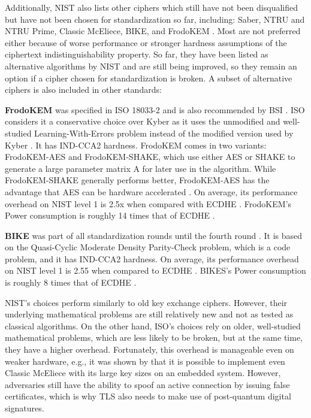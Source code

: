 \documentclass[public,noindent]{aisecreport}
\begin{document}
Additionally, NIST also lists other ciphers which still have not been disqualified but have not been chosen for standardization so far, including: Saber, NTRU and NTRU Prime, Classic McEliece, BIKE, and FrodoKEM \cite{alagic2022status, alagic2025status}. Most are not preferred either because of worse performance or stronger hardness assumptions of the ciphertext indistinguishability property. So far, they have been listed as alternative algorithms by NIST and are still being improved, so they remain an option if a cipher chosen for standardization is broken. A subset of alternative ciphers is also included in other standards: 

\textbf{FrodoKEM} was specified in ISO 18033-2 \cite{ISO86890} and is also recommended by BSI \cite{unknown-author-2024-4}. ISO considers it a conservative choice over Kyber as it uses the unmodified and well-studied Learning-With-Errors problem instead of the modified version used by Kyber \cite{unknown-author-2024-4, FrodoKEM2024}. It has IND-CCA2 hardness. FrodoKEM comes in two variants: FrodoKEM-AES and FrodoKEM-SHAKE, which use either AES or SHAKE to generate a large parameter matrix A for later use in the algorithm. While FrodoKEM-SHAKE generally performs better, FrodoKEM-AES has the advantage that AES can be hardware accelerated \cite{NIST-FrodoKEM-20200930}. On average, its performance overhead on NIST level 1 is 2.5x when compared with ECDHE \cite{alnahawi2024comprehensive}. FrodoKEM's Power consumption is roughly 14 times that of ECDHE \cite{tasopoulos2023energy}.

\textbf{BIKE} was part of all standardization rounds until the fourth round \cite{alagic2025status}. It is based on the Quasi-Cyclic Moderate Density Parity-Check problem, which is a code problem, and it has IND-CCA2 hardness. On average, its performance overhead on NIST level 1 is 2.55 when compared to ECDHE \cite{alnahawi2024comprehensive}. BIKES's Power consumption is roughly 8 times that of ECDHE \cite{tasopoulos2023energy}. 

NIST's choices perform similarly to old key exchange ciphers. However, their underlying mathematical problems are still relatively new and not as tested as classical algorithms. On the other hand, ISO's choices rely on older, well-studied mathematical problems, which are less likely to be broken, but at the same time, they have a higher overhead. Fortunately, this overhead is manageable even on weaker hardware, e.g., it was shown by \cite{wagner-2025} that it is possible to implement even Classic McEliece with its large key sizes on an embedded system. However, adversaries still have the ability to spoof an active connection by issuing false certificates, which is why TLS also needs to make use of post-quantum digital signatures.
\end{document}
